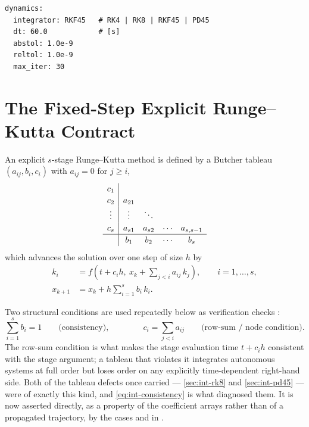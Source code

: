\begin{lstlisting}[language=yamlcfg, caption={Scenario-file form of \cref{tab:int-knobs}.}, label={lst:int-yaml}]
dynamics:
  integrator: RKF45   # RK4 | RK8 | RKF45 | PD45
  dt: 60.0            # [s]
  abstol: 1.0e-9
  reltol: 1.0e-9
  max_iter: 30
\end{lstlisting}

\section{The Fixed-Step Explicit Runge--Kutta Contract}
\label{sec:int-rk}

An explicit $s$-stage Runge--Kutta method is defined by a Butcher tableau
$(a_{ij}, b_i, c_i)$ with $a_{ij} = 0$ for $j \ge i$,
\begin{equation}
  \label{eq:int-tableau}
  \renewcommand{\arraystretch}{1.15}
  \begin{array}{c|cccc}
    c_1    &        &        &        &           \\
    c_2    & a_{21} &        &        &           \\
    \vdots & \vdots & \ddots &        &           \\
    c_s    & a_{s1} & a_{s2} & \cdots & a_{s,s-1} \\
    \hline
           & b_1    & b_2    & \cdots & b_s
  \end{array}
\end{equation}
which advances the solution over one step of size $h$ by
\begin{align}
  \label{eq:int-stage}
  k_i &= f\!\left(t + c_i h,\ x_k + \sum_{j<i} a_{ij}\, k_j\right),
        \qquad i = 1,\dots,s, \\
  \label{eq:int-update}
  x_{k+1} &= x_k + h \sum_{i=1}^{s} b_i\, k_i .
\end{align}

Two structural conditions are used repeatedly below as verification checks
\citep[Ch.~II.1]{hairer1993}:
\begin{equation}
  \label{eq:int-consistency}
  \sum_{i=1}^{s} b_i = 1
  \qquad\text{(consistency)},
  \qquad\qquad
  c_i = \sum_{j<i} a_{ij}
  \qquad\text{(row-sum / node condition)}.
\end{equation}
The row-sum condition is what makes the stage evaluation time $t + c_i h$
consistent with the stage argument; a tableau that violates it integrates
autonomous systems at full order but loses order on any explicitly
time-dependent right-hand side. Both of the tableau defects \lupnt{} once
carried --- \cref{sec:int-rk8} and \cref{sec:int-pd45} --- were of exactly
this kind, and \cref{eq:int-consistency} is what diagnosed them. It is now
asserted directly, as a property of the coefficient arrays rather than of a
propagated trajectory, by the cases
 and
 in
.

